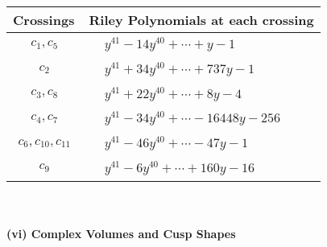 \documentclass[1p]{elsarticle_modified}
\theoremstyle{definition}
\begin{document}
\begin{tabular}{m{50pt}|m{274pt}}
Crossings & \hspace{64pt}Riley Polynomials at each crossing \\
\hline $$\begin{aligned}c_{1},c_{5}\end{aligned}$$&$\begin{aligned}
&y^{41}-14 y^{40}+\cdots+y-1
\end{aligned}$\\
\hline $$\begin{aligned}c_{2}\end{aligned}$$&$\begin{aligned}
&y^{41}+34 y^{40}+\cdots+737 y-1
\end{aligned}$\\
\hline $$\begin{aligned}c_{3},c_{8}\end{aligned}$$&$\begin{aligned}
&y^{41}+22 y^{40}+\cdots+8 y-4
\end{aligned}$\\
\hline $$\begin{aligned}c_{4},c_{7}\end{aligned}$$&$\begin{aligned}
&y^{41}-34 y^{40}+\cdots-16448 y-256
\end{aligned}$\\
\hline $$\begin{aligned}c_{6},c_{10},c_{11}\end{aligned}$$&$\begin{aligned}
&y^{41}-46 y^{40}+\cdots-47 y-1
\end{aligned}$\\
\hline $$\begin{aligned}c_{9}\end{aligned}$$&$\begin{aligned}
&y^{41}-6 y^{40}+\cdots+160 y-16
\end{aligned}$\\
\hline
\end{tabular}\\~\\
\newpage\flushleft \textbf{(vi) Complex Volumes and Cusp Shapes}
\end{document}
